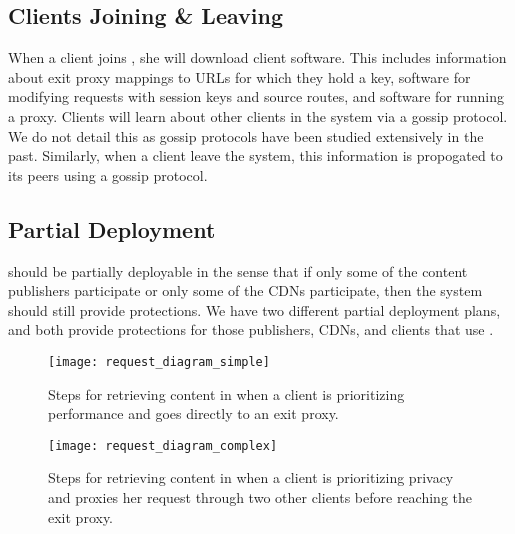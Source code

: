 \subsection{Clients Joining \& Leaving}
\label{sec:join}

When a client joins \system{}, she will download \system{} client software.  This includes information about exit proxy mappings to URLs for which they hold a key, 
software for modifying requests with session keys and source routes, and software for running a proxy.  Clients will learn about other clients in the system via 
a gossip protocol.  We do not detail this as gossip protocols have been studied extensively in the past.  Similarly, when a client leave the system, this 
information is propogated to its peers using a gossip protocol.

\subsection{Partial Deployment}
\label{sec:partial}
\system{} should be partially deployable in the sense that if only some of the content publishers participate or only some of the CDNs participate, then 
the system should still provide protections.  We have two different partial deployment plans, and both provide protections for those 
publishers, CDNs, and clients that use \system{}. 

\begin{figure}[t!]
\centering
\texttt{[image: request\_diagram\_simple]}
\caption{Steps for retrieving content in \system{} when a client is prioritizing 
performance and goes directly to an exit proxy.}
\label{fig:retrieving}
\end{figure}

\begin{figure}[t!]
\centering
\texttt{[image: request\_diagram\_complex]}
\caption{Steps for retrieving content in \system{} when a client is prioritizing 
privacy and proxies her request through two other clients before reaching the 
exit proxy.}
\label{fig:retrieving2}
\end{figure}

